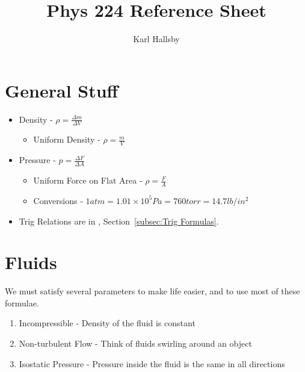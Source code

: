 \documentclass[10pt,letterpaper,final,twoside,notitlepage]{article}
\author{Karl Hallsby}
\title{Phys 224 Reference Sheet}
\numberwithin{equation}{section} %
\theoremstyle{definition}
\begin{document}
\section{General Stuff} \label{sec:General}
	\begin{itemize}[noitemsep]
		\item Density - $\rho = \frac{\Delta m}{\Delta V}$
			\begin{itemize}
				\item Uniform Density - $\rho = \frac{m}{V}$
			\end{itemize}
		
		\item Pressure - $p = \frac{\Delta F}{\Delta A}$
			\begin{itemize}
				\item Uniform Force on Flat Area - $\rho = \frac{F}{A}$
				\item Conversions - $1 atm = 1.01 \times 10^5 Pa = 760 torr = 14.7 lb/in^2$
			\end{itemize}
		\item Trig Relations are in , Section~\ref{subsec:Trig Formulas}.
	\end{itemize}

\section{Fluids} \label{sec:Fluids}
We must satisfy several parameters to make life easier, and to use most of these formulae.
	\begin{enumerate}[noitemsep]
		\item Incompressible - Density of the fluid is constant
		\item Non-turbulent Flow - Think of fluids swirling around an object
		\item Isostatic Pressure - Pressure inside the fluid is the same in all directions
	\end{enumerate}
\end{document}
